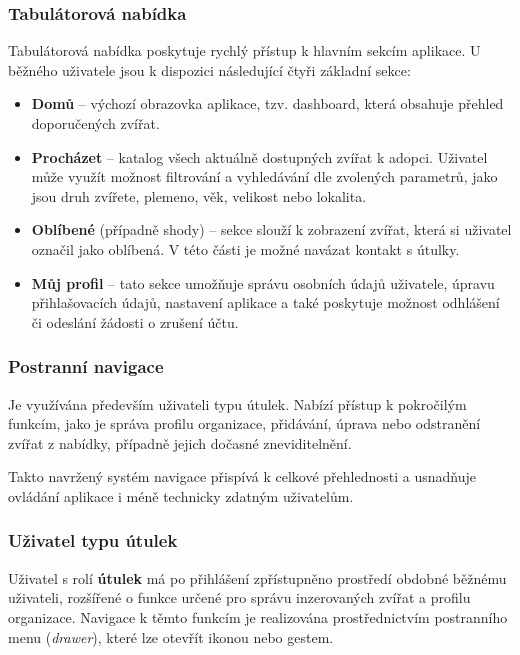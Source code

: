 \documentclass[czech, bp, kiv, he, iso690numb, pdf]{fasthesis}
\begin{document}
    \subsubsection*{Tabulátorová nabídka}
    Tabulátorová nabídka poskytuje rychlý přístup k hlavním sekcím aplikace. U běžného uživatele jsou k dispozici následující čtyři základní sekce:

    \begin{itemize}
        \item \textbf{Domů} – výchozí obrazovka aplikace, tzv. dashboard, která obsahuje přehled doporučených zvířat.

        \item \textbf{Procházet} – katalog všech aktuálně dostupných zvířat k adopci. Uživatel může využít možnost filtrování a vyhledávání dle zvolených parametrů, jako jsou druh zvířete, plemeno, věk, velikost nebo lokalita.

        \item \textbf{Oblíbené} (případně shody) – sekce slouží k zobrazení zvířat, která si uživatel označil jako oblíbená. V této části je možné navázat kontakt s útulky.

        \item \textbf{Můj profil} – tato sekce umožňuje správu osobních údajů uživatele, úpravu přihlašovacích údajů, nastavení aplikace a také poskytuje možnost odhlášení či odeslání žádosti o zrušení účtu.
    \end{itemize}

    \subsubsection*{Postranní navigace}

    Je využívána především uživateli typu útulek. Nabízí přístup k pokročilým funkcím, jako je správa profilu organizace, přidávání, úprava nebo odstranění zvířat z nabídky, případně jejich dočasné zneviditelnění.

    Takto navržený systém navigace přispívá k celkové přehlednosti a usnadňuje ovládání aplikace i méně technicky zdatným uživatelům.

    \subsubsection*{Uživatel typu útulek}

    Uživatel s rolí \textbf{útulek} má po přihlášení zpřístupněno prostředí obdobné běžnému uživateli, rozšířené o funkce určené pro správu inzerovaných zvířat a profilu organizace. Navigace k těmto funkcím je realizována prostřednictvím postranního menu (\textit{drawer}), které lze otevřít ikonou nebo gestem.
\end{document}
